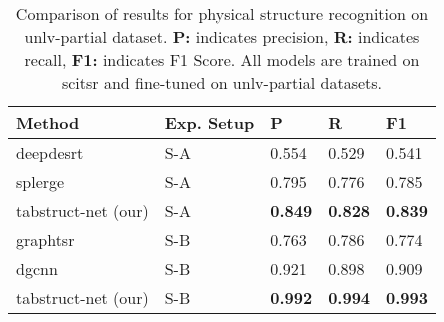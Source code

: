 \documentclass[runningheads]{llncs}
\begin{document}
\begin{table}
\begin{center}
\begin{tabular}{|l |l |l l l |} \hline
\textbf{Method} &\textbf{Exp. Setup} &\textbf{P} &\textbf{R} &\textbf{F1} \\ \hline
{\sc d}eep{\sc d}e{\sc srt}~\cite{schreiber2017deepdesrt} &S-A &0.554 &0.529 &0.541 \\
{\sc splerge}~\cite{table_splitting} &S-A &0.795 &0.776 &0.785 \\
{\sc t}ab{\sc s}truct-{\sc n}et (our) &S-A &\textbf{0.849} &\textbf{0.828} &\textbf{0.839} \\ \hline
{\sc g}raph{\sc tsr}~\cite{chi2019complicated} &S-B &0.763 &0.786 &0.774 \\
{\sc dgcnn}~\cite{qasim2019rethinking} &S-B &0.921 &0.898 &0.909 \\
{\sc t}ab{\sc s}truct-{\sc n}et (our) &S-B &\textbf{0.992} &\textbf{0.994} &\textbf{0.993} \\ \hline
\end{tabular}
\end{center}
\caption{Comparison of results for physical structure recognition on {\sc unlv}-partial dataset. \textbf{P:} indicates precision, \textbf{R:} indicates recall, \textbf{F1:} indicates F1 Score. All models are trained on {\sc s}ci{\sc tsr} and fine-tuned on {\sc unlv}-partial datasets.} \label{table_physical_unlv}
\end{table}
\end{document}
